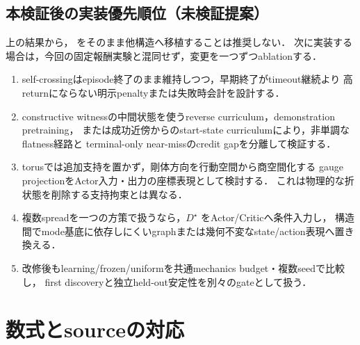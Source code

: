 \documentclass[a4paper,11pt]{ltjsarticle}
\newcommand{\Code}[1]{\texttt{\detokenize{#1}}}
\begin{document}
\subsection*{本検証後の実装優先順位（未検証提案）}

上の結果から，\Code{ori_codex4} をそのまま他構造へ移植することは推奨しない．
次に実装する場合は，今回の固定報酬実験と混同せず，変更を一つずつablationする．

\begin{enumerate}
  \item self-crossingはepisode終了のまま維持しつつ，早期終了がtimeout継続より
  高returnにならない明示penaltyまたは失敗時会計を設計する．
  \item constructive witnessの中間状態を使うreverse curriculum，demonstration pretraining，
  または成功近傍からのstart-state curriculumにより，非単調なflatness経路と
  terminal-only near-missのcredit gapを分離して検証する．
  \item torusでは追加支持を置かず，剛体方向を行動空間から商空間化する
  gauge projectionをActor入力・出力の座標表現として検討する．
  これは物理的な折状態を削除する支持拘束とは異なる．
  \item 複数spreadを一つの方策で扱うなら，$D^\star$ をActor/Criticへ条件入力し，
  構造間でmode基底に依存しにくいgraphまたは幾何不変なstate/action表現へ置き換える．
  \item 改修後もlearning/frozen/uniformを共通mechanics budget・複数seedで比較し，
  first discoveryと独立held-out安定性を別々のgateとして扱う．
\end{enumerate}

\appendix
\section{数式とsourceの対応}
\end{document}
